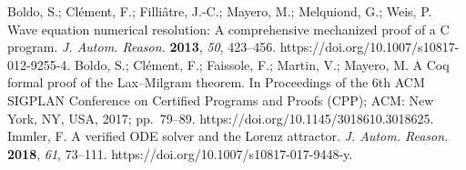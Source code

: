  Boldo, S.; Cl\'ement, F.; Filli\^atre, J.-C.; Mayero, M.; Melquiond, G.; Weis, P. Wave equation numerical resolution: A comprehensive mechanized proof of a C program. \textit{J. Autom. Reason.} \textbf{2013}, \textit{50}, 423--456. https://doi.org/10.1007/s10817-012-9255-4.
 Boldo, S.; Cl\'ement, F.; Faissole, F.; Martin, V.; Mayero, M. A Coq formal proof of the Lax--Milgram theorem. In Proceedings of the 6th ACM SIGPLAN Conference on Certified Programs and Proofs (CPP); ACM: New York, NY, USA, 2017; pp.\ 79--89. https://doi.org/10.1145/3018610.3018625.
 Immler, F. A verified ODE solver and the Lorenz attractor. \textit{J. Autom. Reason.} \textbf{2018}, \textit{61}, 73--111. https://doi.org/10.1007/s10817-017-9448-y.


